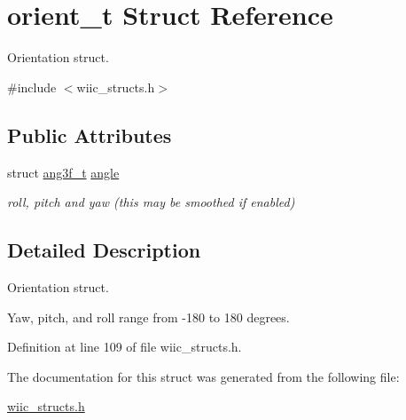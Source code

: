 \hypertarget{structorient__t}{\section{orient\-\_\-t \-Struct \-Reference}
\label{structorient__t}
}


\-Orientation struct.  




{\ttfamily \#include $<$wiic\-\_\-structs.\-h$>$}

\subsection*{\-Public \-Attributes}
\begin{DoxyCompactItemize}
\item 
\hypertarget{structorient__t_a0703101bf0e89193a67f55d07e83822e}{struct \hyperlink{structang3f__t}{ang3f\-\_\-t} \hyperlink{structorient__t_a0703101bf0e89193a67f55d07e83822e}{angle}}\label{structorient__t_a0703101bf0e89193a67f55d07e83822e}

\begin{DoxyCompactList}\small\item\em roll, pitch and yaw (this may be smoothed if enabled) \end{DoxyCompactList}\end{DoxyCompactItemize}


\subsection{\-Detailed \-Description}
\-Orientation struct. 

\-Yaw, pitch, and roll range from -\/180 to 180 degrees. 

\-Definition at line 109 of file wiic\-\_\-structs.\-h.



\-The documentation for this struct was generated from the following file\-:\begin{DoxyCompactItemize}
\item 
\hyperlink{wiic__structs_8h}{wiic\-\_\-structs.\-h}\end{DoxyCompactItemize}
